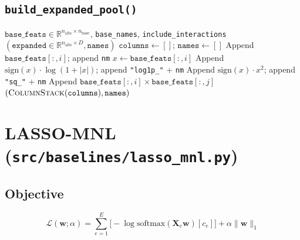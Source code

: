 \documentclass[11pt,a4paper]{article}
\begin{document}
\subsection{\texttt{build\_expanded\_pool()}}

\begin{algorithm}[H]
\caption{\textsc{BuildExpandedPool}}\label{alg:expand-pool}
\begin{algorithmic}[1]
\Require $\texttt{base\_feats} \in \mathbb{R}^{n_{\text{alts}} \times n_{\text{base}}}$, \texttt{base\_names}, \texttt{include\_interactions}
\Ensure $(\texttt{expanded} \in \mathbb{R}^{n_{\text{alts}} \times D}, \texttt{names})$
\State $\texttt{columns} \gets []$; \; $\texttt{names} \gets []$
 
    \State Append $\texttt{base\_feats}[:, i]$; append \texttt{nm}
\EndFor
{} 
    \State $x \gets \texttt{base\_feats}[:, i]$
    \State Append $\text{sign}(x) \cdot \log(1 + |x|)$; append \texttt{"log1p\_"} + \texttt{nm}
\EndFor
{} 
    \State Append $\text{sign}(x) \cdot x^2$; append \texttt{"sq\_"} + \texttt{nm}
\EndFor
{} 
            \State Append $\texttt{base\_feats}[:, i] \times \texttt{base\_feats}[:, j]$
        \EndFor
    \EndFor
\EndIf
\State \Return $(\Call{ColumnStack}{\texttt{columns}}, \texttt{names})$
\end{algorithmic}
\end{algorithm}


\section{LASSO-MNL (\texttt{src/baselines/lasso\_mnl.py})}
\label{sec:lasso}

\subsection{Objective}

\[
\mathcal{L}(\mathbf{w}; \alpha) = \sum_{e=1}^{E} \bigl[-\log \text{softmax}(\mathbf{X}_e \mathbf{w})[c_e]\bigr] + \alpha \|\mathbf{w}\|_1
\]
\end{document}
